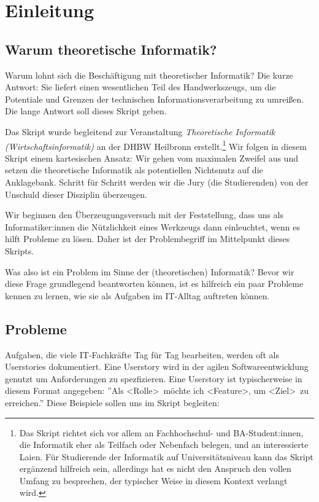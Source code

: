\chapter{Einleitung}\label{einleitung}
\section{Warum theoretische Informatik?}
Warum lohnt sich die Beschäftigung mit theoretischer Informatik?
Die kurze Antwort: Sie liefert einen wesentlichen Teil des Handwerkszeugs,
um die Potentiale und Grenzen der technischen Informationsverarbeitung zu umreißen.
Die lange Antwort soll dieses Skript geben.

Das Skript wurde begleitend zur Veranstaltung
\emph{Theoretische Informatik (Wirtschaftsinformatik)}
an der DHBW Heilbronn erstellt.\footnote{
    Das Skript richtet sich vor allem an Fachhochschul- und BA-Student:innen,
    die Informatik eher als Teilfach oder Nebenfach belegen, und an interessierte Laien.
    Für Studierende der Informatik auf Universitätsniveau kann das Skript ergänzend hilfreich sein,
    allerdings hat es nicht den Anspruch den vollen Umfang zu besprechen,
    der typischer Weise in diesem Kontext verlangt wird.}
Wir folgen in diesem Skript einem kartesischen Ansatz:
Wir gehen vom maximalen Zweifel aus und setzen die theoretische Informatik
als potentiellen Nichtsnutz auf die Anklagebank.
Schritt für Schritt werden wir die Jury (die Studierenden) von der Unschuld dieser
Disziplin überzeugen.

Wir beginnen den Überzeugungsversuch mit der Feststellung,
dass uns als Informatiker:innen die Nützlichkeit
eines Werkzeugs dann einleuchtet, wenn es hilft Probleme zu lösen.
Daher ist der Problembegriff im Mittelpunkt dieses Skripts.

Was also ist ein Problem im Sinne der (theoretischen) Informatik?
Bevor wir diese Frage grundlegend beantworten können,
ist es hilfreich ein paar Probleme kennen zu lernen,
wie sie als Aufgaben im IT-Alltag auftreten können.

\section{Probleme}
Aufgaben, die viele IT-Fachkräfte Tag für Tag bearbeiten,
werden oft als Userstories dokumentiert.
Eine Userstory wird in der agilen Softwareentwicklung genutzt um Anforderungen zu spezfizieren.
Eine Userstory ist typischerweise in diesem Format angegeben:
''Als \textless Rolle\textgreater\ möchte ich \textless Feature\textgreater,
um \textless Ziel\textgreater\ zu erreichen.''
Diese Beispiele sollen uns im Skript begleiten:

